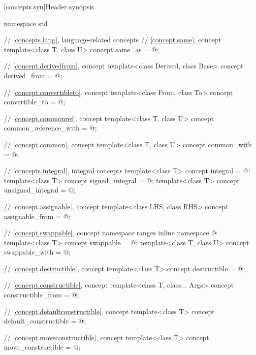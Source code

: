 [concepts.syn]{Header  synopsis}

%
\begin{codeblock}
namespace std {
  // \ref{concepts.lang}, language-related concepts
  // \ref{concept.same}, concept 
  template<class T, class U>
    concept same_as = @\seebelow@;

  // \ref{concept.derivedfrom}, concept 
  template<class Derived, class Base>
    concept derived_from = @\seebelow@;

  // \ref{concept.convertibleto}, concept 
  template<class From, class To>
    concept convertible_to = @\seebelow@;

  // \ref{concept.commonref}, concept 
  template<class T, class U>
    concept common_reference_with = @\seebelow@;

  // \ref{concept.common}, concept 
  template<class T, class U>
    concept common_with = @\seebelow@;

  // \ref{concepts.integral}, integral concepts
  template<class T>
    concept integral = @\seebelow@;
  template<class T>
    concept signed_integral = @\seebelow@;
  template<class T>
    concept unsigned_integral = @\seebelow@;

  // \ref{concept.assignable}, concept 
  template<class LHS, class RHS>
    concept assignable_from = @\seebelow@;

  // \ref{concept.swappable}, concept 
  namespace ranges {
    inline namespace @
  }
  template<class T>
    concept swappable = @\seebelow@;
  template<class T, class U>
    concept swappable_with = @\seebelow@;

  // \ref{concept.destructible}, concept 
  template<class T>
    concept destructible = @\seebelow@;

  // \ref{concept.constructible}, concept 
  template<class T, class... Args>
    concept constructible_from = @\seebelow@;

  // \ref{concept.defaultconstructible}, concept 
  template<class T>
    concept default_constructible = @\seebelow@;

  // \ref{concept.moveconstructible}, concept 
  template<class T>
    concept move_constructible = @\seebelow@;

}
\end{codeblock}
